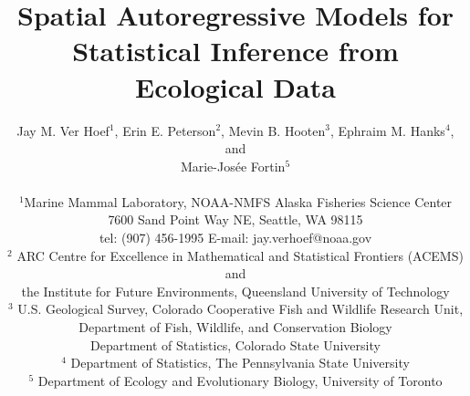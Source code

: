 \documentclass[11pt, titlepage]{article}\usepackage[]{graphicx}\usepackage[]{color}
\begin{document}

\titlepage
\title {Spatial Autoregressive Models for Statistical Inference from Ecological Data}
\author{Jay M. Ver Hoef$^1$, Erin E. Peterson$^2$, Mevin B. Hooten$^3$, Ephraim M. Hanks$^4$, and \\
	Marie-Jos\'{e}e Fortin$^5$ \\
\hrulefill \\ 
$^1$Marine Mammal Laboratory, NOAA-NMFS Alaska Fisheries Science Center\\
7600 Sand Point Way NE, Seattle, WA 98115\\
tel: (907) 456-1995 \hspace{.5cm} E-mail: jay.verhoef@noaa.gov\\
$^2$ ARC Centre for Excellence in Mathematical and Statistical Frontiers (ACEMS) and \\
the Institute for Future Environments, Queensland University of Technology \\ 
$^3$ U.S. Geological Survey, Colorado Cooperative Fish and Wildlife Research Unit, \\
Department of Fish, Wildlife, and Conservation Biology \\
Department of Statistics, Colorado State University \\
$^4$ Department of Statistics, The Pennsylvania State University \\
$^5$ Department of Ecology and Evolutionary Biology, University of Toronto \\
\hrulefill \\
}

\maketitle

\end{document}
